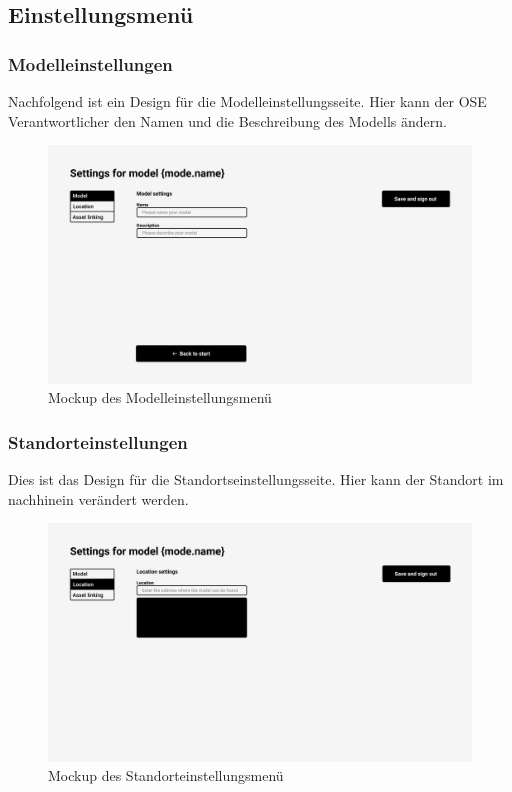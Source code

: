 \subsection{Einstellungsmenü}
\subsubsection{Modelleinstellungen}
Nachfolgend ist ein Design für die Modelleinstellungsseite. Hier kann der OSE Verantwortlicher den Namen und die Beschreibung des Modells ändern.
\begin{figure}[H]
  \centering
  \includegraphics[width=1\textwidth]{./mockups/settings/Model.pdf}
  \caption[{Mockup des Modelleinstellungsmenü}]{Mockup des Modelleinstellungsmenü}
  \label{fig:mck-model}
\end{figure}
\pagebreak
\subsubsection{Standorteinstellungen}
Dies ist das Design für die Standortseinstellungsseite. Hier kann der Standort im nachhinein verändert werden.
\begin{figure}[H]
  \centering
  \includegraphics[width=1\textwidth]{./mockups/settings/Model-1.pdf}
  \caption[{Mockup des Standorteinstellungsmenü}]{Mockup des Standorteinstellungsmenü}
  \label{fig:mck-model_1}
\end{figure}
\pagebreak
